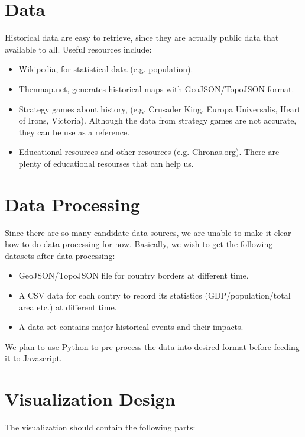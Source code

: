 \documentclass[12pt, fullpage,letterpaper]{article}
\begin{document}
\section{Data}
Historical data are easy to retrieve, since they are actually public data that available to all.
Useful resources include:

\begin{itemize}
    \item Wikipedia, for statistical data (e.g. population).
    \item Thenmap.net, generates historical maps with GeoJSON/TopoJSON format.
    \item Strategy games about history, (e.g. Crusader King, Europa Universalis, Heart of Irons, Victoria). Although the data from strategy games are not accurate, they can be use
        as a reference.
    \item Educational resources and other resources (e.g. Chronas.org). There are plenty of educational resourses that can help us.
\end{itemize}

\section{Data Processing}
Since there are so many candidate data sources, we are unable to make it clear how to do data processing for now.
Basically, we wish to get the following datasets after data processing:
\begin{itemize}
    \item GeoJSON/TopoJSON file for country borders at different time.
    \item A CSV data for each contry to record its statistics (GDP/population/total area etc.) at different time.
    \item A data set contains major historical events and their impacts.
\end{itemize}

We plan to use Python to pre-process the data into desired format before feeding it to Javascript.

\section{Visualization Design}

The visualization should contain the following parts:
\end{document}
